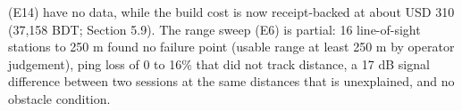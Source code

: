 (E14) have no data, while the build cost is now receipt-backed at about USD 310 (37,158 BDT; Section 5.9). The range sweep (E6) is partial: 16 line-of-sight stations to 250 m found no failure point (usable range at least 250 m by operator judgement), ping loss of 0 to 16\% that did not track distance, a 17 dB signal difference between two sessions at the same distances that is unexplained, and no obstacle condition.
